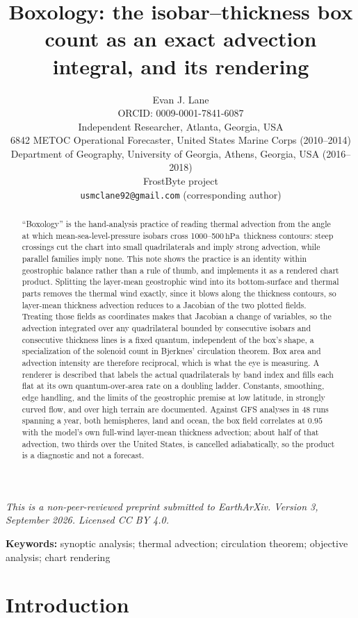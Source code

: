 \documentclass[11pt]{article}
\title{Boxology: the isobar--thickness box count as an exact advection integral, and its rendering}
\author{Evan J. Lane\\[3pt]
\small ORCID: 0009-0001-7841-6087\\
\small Independent Researcher, Atlanta, Georgia, USA\\
\small 6842 METOC Operational Forecaster, United States Marine Corps (2010--2014)\\
\small Department of Geography, University of Georgia, Athens, Georgia, USA (2016--2018)\\
\small FrostByte project\\
\small \texttt{usmclane92@gmail.com} (corresponding author)}
\date{}
\newcommand{\hPa}{\ensuremath{\,\mathrm{hPa}}}
\begin{document}
\maketitle

\noindent\emph{This is a non-peer-reviewed preprint submitted to EarthArXiv. Version 3, September 2026. Licensed CC BY 4.0.}

\begin{abstract}
\noindent
``Boxology'' is the hand-analysis practice of reading thermal advection from the angle at which mean-sea-level-pressure isobars cross 1000--500\hPa\ thickness contours: steep crossings cut the chart into small quadrilaterals and imply strong advection, while parallel families imply none. This note shows the practice is an identity within geostrophic balance rather than a rule of thumb, and implements it as a rendered chart product. Splitting the layer-mean geostrophic wind into its bottom-surface and thermal parts removes the thermal wind exactly, since it blows along the thickness contours, so layer-mean thickness advection reduces to a Jacobian of the two plotted fields. Treating those fields as coordinates makes that Jacobian a change of variables, so the advection integrated over any quadrilateral bounded by consecutive isobars and consecutive thickness lines is a fixed quantum, independent of the box's shape, a specialization of the solenoid count in Bjerknes' circulation theorem. Box area and advection intensity are therefore reciprocal, which is what the eye is measuring. A renderer is described that labels the actual quadrilaterals by band index and fills each flat at its own quantum-over-area rate on a doubling ladder. Constants, smoothing, edge handling, and the limits of the geostrophic premise at low latitude, in strongly curved flow, and over high terrain are documented. Against GFS analyses in 48 runs spanning a year, both hemispheres, land and ocean, the box field correlates at $0.95$ with the model's own full-wind layer-mean thickness advection; about half of that advection, two thirds over the United States, is cancelled adiabatically, so the product is a diagnostic and not a forecast.
\end{abstract}

\noindent\textbf{Keywords:} synoptic analysis; thermal advection; circulation theorem; objective analysis; chart rendering

\section{Introduction}
\end{document}
